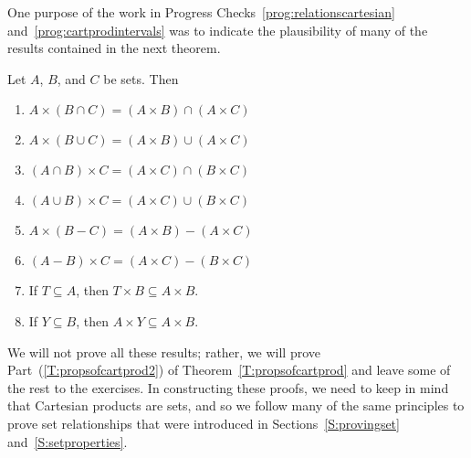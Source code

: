 One purpose of the work in Progress Checks~\ref{prog:relationscartesian} 
and~\ref{prog:cartprodintervals} was to indicate the plausibility of many of the results contained in the next theorem.
%
\begin{theorem}\label{T:propsofcartprod}
Let  $A$, $B$, and  $C$  be sets.  Then
\begin{enumerate}
\item $A \times \left( {B \cap C} \right) = \left( {A \times B} \right) \cap \left( {A \times C} \right)$ 
\label{T:propsofcartprod1}%
 
\item $A \times \left( {B \cup C} \right) = \left( {A \times B} \right) \cup \left( {A \times C} \right)$ 
\label{T:propsofcartprod2}%

\item $\left( {A \cap B} \right) \times C = \left( {A \times C} \right) \cap \left( {B \times C} \right)$ 
\label{T:propsofcartprod3}%

\item $\left( {A \cup B} \right) \times C = \left( {A \times C} \right) \cup \left( {B \times C} \right)$ 
\label{T:propsofcartprod4}%

\item $A \times \left( {B - C} \right) = \left( {A \times B} \right) - \left( {A \times C} \right)$ 
\label{T:propsofcartprod5}%

\item $\left( {A - B} \right) \times C = \left( {A \times C} \right) - \left( {B \times C} \right)$ 
\label{T:propsofcartprod6}%

\item If  $T \subseteq A$, then  $T \times B \subseteq A \times B$. 
\label{T:propsofcartprod7}%

\item If  $Y \subseteq B$, then  $A \times Y \subseteq A \times B$. 
\label{T:propsofcartprod8}%
\end{enumerate}
\end{theorem}
%
We will not prove all these results; rather, we will prove 
Part~(\ref{T:propsofcartprod2}) of Theorem~\ref{T:propsofcartprod} and leave some of the rest to the exercises.  In constructing these proofs, we need to keep in mind that Cartesian products are sets, and so we follow many of the same principles to prove set relationships that were introduced in Sections~\ref{S:provingset} and~\ref{S:setproperties}.  

